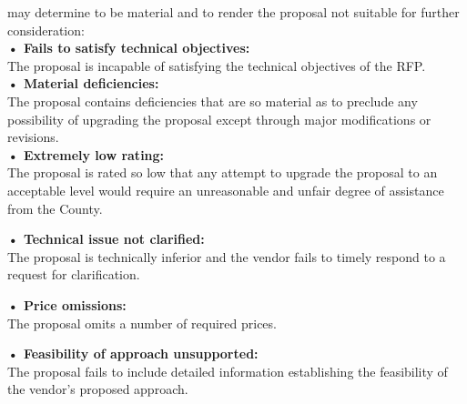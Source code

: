 \documentclass[12pt]{article}
\begin{document}
may determine to be material and to render the proposal not suitable for further
consideration:\\
\textbf{• Fails to satisfy technical objectives:} \\The proposal is incapable of satisfying
the technical objectives of the RFP.\\
\textbf{• Material deficiencies:} \\The proposal contains deficiencies that are so
material as to preclude any possibility of upgrading the proposal except
through major modifications or revisions.\\
\textbf{• Extremely low rating:} \\The proposal is rated so low that any attempt to
upgrade the proposal to an acceptable level would require an
unreasonable and unfair degree of assistance from the County.

\textbf{• Technical issue not clarified:} \\The proposal is technically inferior and the
vendor fails to timely respond to a request for clarification.

\textbf{• Price omissions:} \\The proposal omits a number of required prices.

\textbf{• Feasibility of approach unsupported:} \\The proposal fails to include detailed
information establishing the feasibility of the vendor’s proposed approach.
\end{document}
